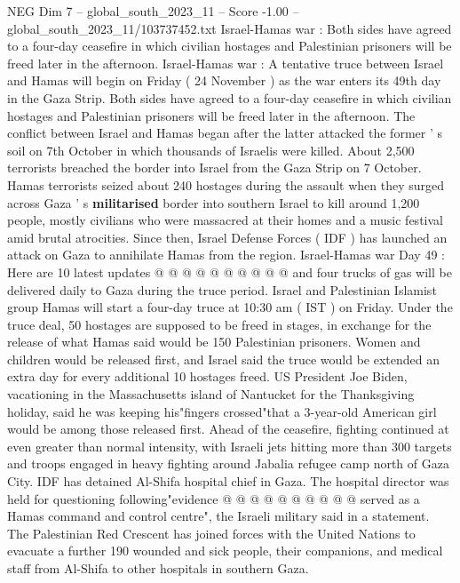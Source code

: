 \begin{textsample}{NEG Dim 7 – global\_south\_2023\_11 – Score -1.00 – global\_south\_2023\_11/103737452.txt}  \label{ex:f7_neg_155}
Israel-Hamas war : Both sides have agreed to a four-day ceasefire in which civilian hostages and Palestinian prisoners will be freed later in the afternoon.
Israel-Hamas war : A tentative truce between Israel and Hamas will begin on Friday ( 24 November ) as the war enters its 49th day in the Gaza Strip.
Both sides have agreed to a four-day ceasefire in which civilian hostages and Palestinian prisoners will be freed later in the afternoon.
The conflict between Israel and Hamas began after the latter attacked the former ' s soil on 7th October in which thousands of Israelis were killed.
About 2,500 terrorists breached the border into Israel from the Gaza Strip on 7 October.
Hamas terrorists seized about 240 hostages during the assault when they surged across Gaza ' s \textbf{militarised} border into southern Israel to kill around 1,200 people, mostly civilians who were massacred at their homes and a music festival amid brutal atrocities.
Since then, Israel Defense Forces ( IDF ) has launched an attack on Gaza to annihilate Hamas from the region.
Israel-Hamas war Day 49 : Here are 10 latest updates @ @ @ @ @ @ @ @ @ @ and four trucks of gas will be delivered daily to Gaza during the truce period.
Israel and Palestinian Islamist group Hamas will start a four-day truce at 10:30 am ( IST ) on Friday.
Under the truce deal, 50 hostages are supposed to be freed in stages, in exchange for the release of what Hamas said would be 150 Palestinian prisoners.
Women and children would be released first, and Israel said the truce would be extended an extra day for every additional 10 hostages freed.
US President Joe Biden, vacationing in the Massachusetts island of Nantucket for the Thanksgiving holiday, said he was keeping his"fingers crossed"that a 3-year-old American girl would be among those released first.
Ahead of the ceasefire, fighting continued at even greater than normal intensity, with Israeli jets hitting more than 300 targets and troops engaged in heavy fighting around Jabalia refugee camp north of Gaza City.
IDF has detained Al-Shifa hospital chief in Gaza.
The hospital director was held for questioning following"evidence @ @ @ @ @ @ @ @ @ @ served as a Hamas command and control centre", the Israeli military said in a statement.
The Palestinian Red Crescent has joined forces with the United Nations to evacuate a further 190 wounded and sick people, their companions, and medical staff from Al-Shifa to other hospitals in southern Gaza.

\end{textsample}
